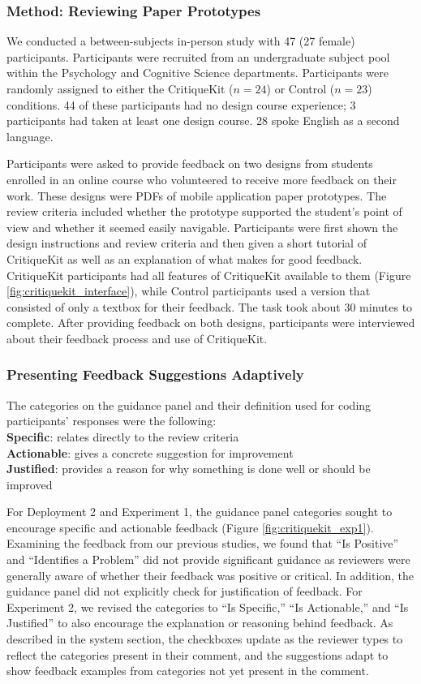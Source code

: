 \subsubsection{Method: Reviewing Paper Prototypes}
We conducted a between-subjects in-person study with 47 (27 female) participants. Participants were recruited from an undergraduate subject pool within the Psychology and Cognitive Science departments. Participants were randomly assigned to either the CritiqueKit ($n = 24$) or Control ($n = 23$) conditions. 44 of these participants had no design course experience; 3 participants had taken at least one design course. 28 spoke English as a second language. 

Participants were asked to provide feedback on two designs from students enrolled in an online course who volunteered to receive more feedback on their work. These designs were PDFs of mobile application paper prototypes. The review criteria included whether the prototype supported the student's point of view and whether it seemed easily navigable. Participants were first shown the design instructions and review criteria and then given a short tutorial of CritiqueKit as well as an explanation of what makes for good feedback. CritiqueKit participants had all features of CritiqueKit available to them (Figure \ref{fig:critiquekit_interface}), while Control participants used a version that consisted of only a textbox for their feedback. The task took about 30 minutes to complete. After providing feedback on both designs, participants were interviewed about their feedback process and use of CritiqueKit. 

\subsubsection{Presenting Feedback Suggestions Adaptively}
The categories on the guidance panel and their definition used for coding participants' responses were the following:\\
\textbf{Specific}: relates directly to the review criteria\\
\textbf{Actionable}: gives a concrete suggestion for improvement\\
\textbf{Justified}: provides a reason for why something is done well or should be improved

For Deployment 2 and Experiment 1, the guidance panel categories sought to encourage specific and actionable feedback (Figure \ref{fig:critiquekit_exp1}). Examining the feedback from our previous studies, we found that ``Is Positive'' and ``Identifies a Problem'' did not provide significant guidance as reviewers were generally aware of whether their feedback was positive or critical. In addition, the guidance panel did not explicitly check for justification of feedback. For Experiment 2, we revised the categories to ``Is Specific,'' ``Is Actionable,'' and ``Is Justified'' to also encourage the explanation or reasoning behind feedback. As described in the system section, the checkboxes update as the reviewer types to reflect the categories present in their comment, and the suggestions adapt to show feedback examples from categories not yet present in the comment. 

